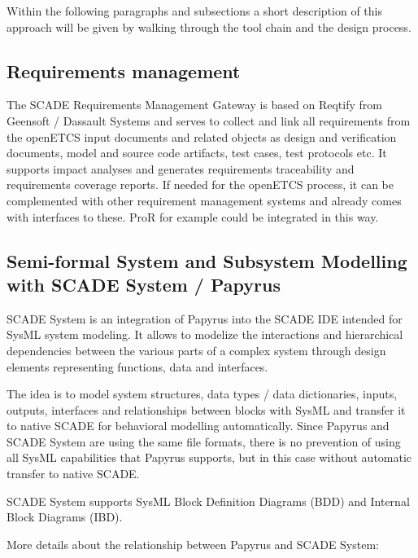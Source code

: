 Within the following paragraphs and subsections a short description of this approach will be given by walking through the tool chain and the design process. 

\subsection{Requirements management}
\label{sec:RequirementsManagement}

The SCADE Requirements Management Gateway is based on Reqtify from Geensoft / Dassault Systems and serves to collect and link all requirements from the openETCS input documents and related objects as design and verification documents, model and source code artifacts, test cases, test protocols etc. It supports impact analyses and generates requirements traceability and requirements coverage reports. 
If needed for the openETCS process, it can be complemented with other requirement management systems and already comes with interfaces to these. ProR for example could be integrated in this way. 


\subsection{Semi-formal System and Subsystem Modelling with SCADE System / Papyrus}
\label{sec:SemiformalModelling}

SCADE System is an integration of Papyrus into the SCADE IDE intended for SysML system modeling. It allows to modelize the interactions and hierarchical dependencies between the various parts of a complex system through design elements representing functions, data and interfaces. 
 
The idea is to model system structures, data types / data dictionaries, inputs, outputs, interfaces and relationships between blocks with SysML and transfer it to native SCADE for behavioral modelling automatically. Since Papyrus and SCADE System are using the same file formats, there is no prevention of using all SysML capabilities that Papyrus supports, but in this case without automatic transfer to native SCADE. 

SCADE System supports SysML Block Definition Diagrams (BDD) and	Internal Block Diagrams (IBD).

More details about the relationship between Papyrus and SCADE System: 


